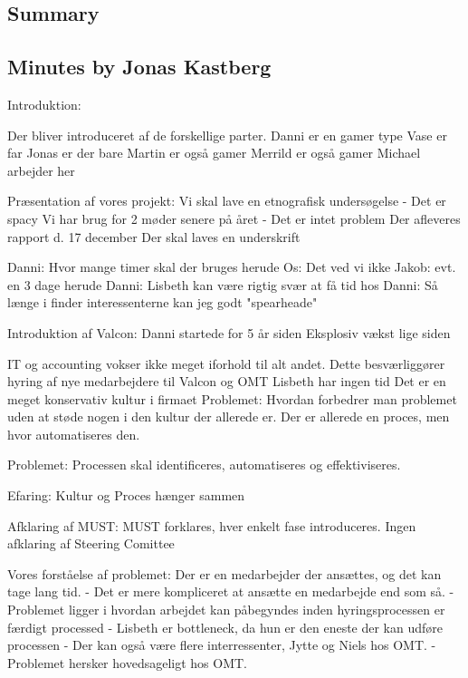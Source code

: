 \label{app:danni_initiation}

\subsection{Summary}


\subsection{Minutes by Jonas Kastberg}
Introduktion:

Der bliver introduceret af de forskellige parter.
Danni er en gamer type
Vase er far
Jonas er der bare
Martin er også gamer
Merrild er også gamer
Michael arbejder her

Præsentation af vores projekt:
Vi skal lave en etnografisk undersøgelse
	- Det er spacy
Vi har brug for 2 møder senere på året
	- Det er intet problem
Der afleveres rapport d. 17 december
Der skal laves en underskrift



Danni: Hvor mange timer skal der bruges herude
Os: Det ved vi ikke
Jakob: evt. en 3 dage herude
Danni: Lisbeth kan være rigtig svær at få tid hos
Danni: Så længe i finder interessenterne kan jeg godt "spearheade"


Introduktion af Valcon:
Danni startede for 5 år siden
Eksplosiv vækst lige siden

IT og accounting vokser ikke meget iforhold til alt andet.
Dette besværliggører hyring af nye medarbejdere til Valcon og OMT
Lisbeth har ingen tid
Det er en meget konservativ kultur i firmaet
Problemet: Hvordan forbedrer man problemet uden at støde nogen i den kultur der allerede er.
Der er allerede en proces, men hvor automatiseres den.

Problemet: Processen skal identificeres, automatiseres og effektiviseres.

Efaring: Kultur og Proces hænger sammen

Afklaring af MUST:
MUST forklares, hver enkelt fase introduceres.
Ingen afklaring af Steering Comittee


Vores forståelse af problemet:
Der er en medarbejder der ansættes, og det kan tage lang tid.
	- Det er mere kompliceret at ansætte en medarbejde end som så.
	- Problemet ligger i hvordan arbejdet kan påbegyndes inden hyringsprocessen er færdigt processed
	- Lisbeth er bottleneck, da hun er den eneste der kan udføre processen
	- Der kan også være flere interressenter, Jytte og Niels hos OMT.
	- Problemet hersker hovedsageligt hos OMT.

